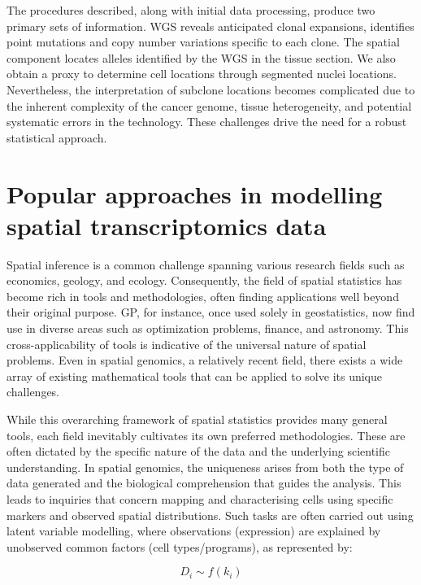 The procedures described, along with initial data processing, produce two primary sets of information. \ac{WGS} reveals anticipated clonal expansions, identifies point mutations and copy number variations specific to each clone. The spatial component locates alleles identified by the \ac{WGS} in the tissue section. We also obtain a proxy to determine cell locations through segmented nuclei locations. Nevertheless, the interpretation of subclone locations becomes complicated due to the inherent complexity of the cancer genome, tissue heterogeneity, and potential systematic errors in the technology. These challenges drive the need for a robust statistical approach.

\section{Popular approaches in modelling spatial transcriptomics data}

Spatial inference is a common challenge spanning various research fields such as economics, geology, and ecology. Consequently, the field of spatial statistics has become rich in tools and methodologies, often finding applications well beyond their original purpose. \acl{GP}, for instance, once used solely in geostatistics, now find use in diverse areas such as optimization problems, finance, and astronomy. This cross-applicability of tools is indicative of the universal nature of spatial problems. Even in spatial genomics, a relatively recent field, there exists a wide array of existing mathematical tools that can be applied to solve its unique challenges.

While this overarching framework of spatial statistics provides many general tools, each field inevitably cultivates its own preferred methodologies. These are often dictated by the specific nature of the data and the underlying scientific understanding. In spatial genomics, the uniqueness arises from both the type of data generated and the biological comprehension that guides the analysis. This leads to inquiries that concern mapping and characterising cells using specific markers and observed spatial distributions. Such tasks are often carried out using latent variable modelling, where observations (expression) are explained by unobserved common factors (cell types/programs), as represented by:

\begin{equation}
D_i \sim f(k_i)
\end{equation}


